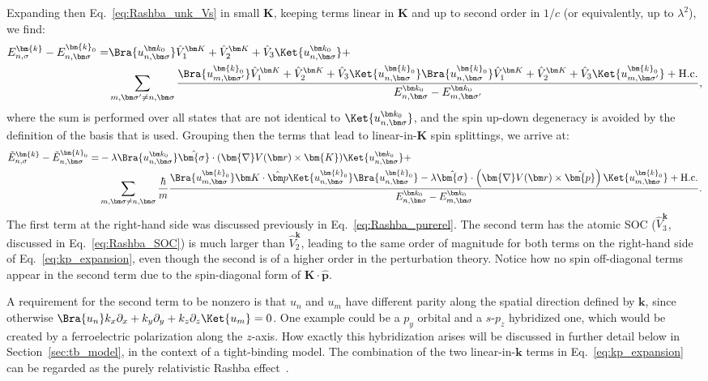 Expanding then Eq.~\eqref{eq:Rashba_unk_Vs} in small $\bm{K}$, keeping terms linear in $\bm{K}$ and up to second order in $1/c$ (or equivalently, up to $\lambda^2$), we find:
\begin{align}
	E_{n,\sigma}^{\bm{k}} - E_{n,\bm \sigma}^{\bm{k}_0} =& \Bra{u_{n,\bm \sigma}^{\bm k_0}} \hat{V}_1^{\bm K} + \hat{V}_2^{\bm K} + \hat{V}_3\Ket{u_{n,\bm \sigma}^{\bm k_0}}+ \\
		& \sum_{m,\bm \sigma' \neq n,\bm \sigma}\frac{\Bra{u_{m,\bm \sigma'}^{\bm{k}_0}} \hat{V}_1^{\bm K} + \hat{V}_2^{\bm K} + \hat{V}_3\Ket{u_{n, \bm \sigma}^{\bm{k}_0}}\Bra{u_{n, \bm \sigma}^{\bm{k}_0}}  \hat{V}_1^{\bm K} + \hat{V}_2^{\bm K} + \hat{V}_3 \Ket{u_{m, \bm \sigma'}^{\bm{k}_0}}+\rm{H.c.}}{E_{n, \bm \sigma}^{\bm k_0}- E_{m, \bm \sigma'}^{\bm k_0}},
\end{align}
where the sum is performed over all states that are not identical to $\Ket{u_{n,\bm \sigma}^{\bm k_0}}$, and the spin up-down degeneracy is avoided by the definition of the basis that is used.
Grouping then the terms that lead to linear-in-$\bm K$ spin splittings, we arrive at:
\begin{align}
	\label{eq:kp_expansion}
	\tilde{E}_{n,\sigma}^{\bm{k}} - \tilde{E}_{n,\bm \sigma}^{\bm{k}_0} =& -\lambda \Bra{u_{n,\bm \sigma}^{\bm k_0}}  \hat{\bm{\sigma}} \cdot ( \bm{\nabla}V(\bm r) \times \bm{K}) \Ket{u_{n,\bm \sigma}^{\bm k_0}} + \\
		& \sum_{m,\bm \sigma \neq n,\bm \sigma}\frac{\hbar}{m}\frac{\Bra{u_{m,\bm \sigma}^{\bm{k}_0}} \bm K \cdot \hat{\bm p} \Ket{u_{n, \bm \sigma}^{\bm{k}_0}}\Bra{u_{n, \bm \sigma}^{\bm{k}_0}} -\lambda \hat{\bm{\sigma}} \cdot \left( \bm{\nabla}V(\bm r) \times \hat{\bm{p}}\right) \Ket{u_{m, \bm \sigma}^{\bm{k}_0}} + \rm{H.c.}}{E_{n, \bm \sigma}^{\bm k_0}- E_{m, \bm \sigma}^{\bm k_0}}.\nonumber
\end{align}
The first term at the right-hand side was discussed previously in Eq.~\eqref{eq:Rashba_purerel}.
The second term has the atomic \gls{SOC} ($\hat{V}^{\bm k}_3$, discussed in Eq.~\eqref{eq:Rashba_SOC}) is much larger than $\hat{V}^{\bm{k}}_2$, leading to the same order of magnitude for both terms on the right-hand side of Eq.~\eqref{eq:kp_expansion}, even though the second is of a higher order in the perturbation theory. Notice how no spin off-diagonal terms appear in the second term due to the spin-diagonal form of $\bm K \cdot \hat{\bm p}$.

A requirement for the second term to be nonzero is that $u_n$ and $u_m$ have different parity along the spatial direction defined by $\bm{k}$, since otherwise $\Bra{u_n} k_x \partial_x + k_y \partial_y + k_z \partial_z \Ket{u_m} = 0$.
One example could be a $p_y$ orbital and a $s$-$p_z$ hybridized one, which would be created by a ferroelectric polarization along the $z$-axis.
How exactly this hybridization arises will be discussed in further detail below in Section~\ref{sec:tb_model}, in the context of a tight-binding model.
The combination of the two linear-in-$\bm{k}$ terms in Eq.~\eqref{eq:kp_expansion} can be regarded as the purely relativistic Rashba effect~\cite{Bahramy2011}.
    
